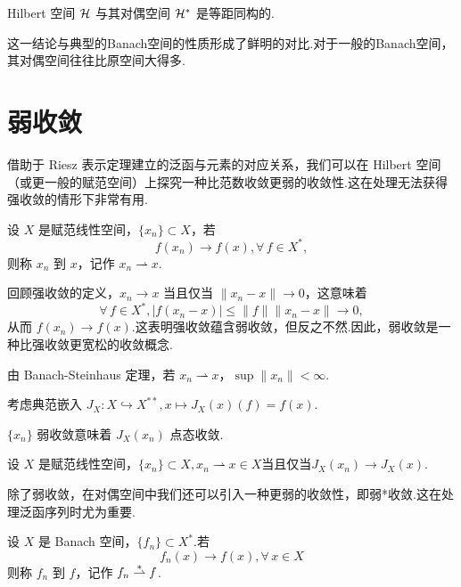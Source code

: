 \begin{corollary}
    Hilbert 空间 $\mathcal{H}$ 与其对偶空间 $\mathcal{H}^*$ 是等距同构的.
\end{corollary}
这一结论与典型的Banach空间的性质形成了鲜明的对比.对于一般的Banach空间，其对偶空间往往比原空间大得多.


\section{弱收敛}
借助于 Riesz 表示定理建立的泛函与元素的对应关系，我们可以在 Hilbert 空间（或更一般的赋范空间）上探究一种比范数收敛更弱的收敛性.这在处理无法获得强收敛的情形下非常有用.

\begin{definition}[弱收敛]
    设 $X$ 是赋范线性空间，$\{x_n\} \subset X$，若
    \begin{equation*}
        f(x_n) \to f(x), \forall\, f \in X^*,
    \end{equation*}
    则称 $x_n$ 到 $x$，记作 $x_n \rightharpoonup x$.
\end{definition}
回顾强收敛的定义，$x_n \to x$ 当且仅当 $\|x_n - x\| \to 0$，这意味着 \begin{equation*}
    \forall\, f \in X^*,|f(x_n - x)| \leq \|f\| \|x_n - x\| \to 0,
\end{equation*}
从而 $f(x_n) \to f(x)$.这表明强收敛蕴含弱收敛，但反之不然.因此，弱收敛是一种比强收敛更宽松的收敛概念.\par

\begin{note}
    由 Banach-Steinhaus 定理，若 $x_n \rightharpoonup x$，$\sup \|x_n\| < \infty$.\par
    考虑典范嵌入 $J_X : X \hookrightarrow X^{**}, x \mapsto J_X(x)(f) = f(x)$.\par
    $\{x_n\}$ 弱收敛意味着 $J_X(x_n)$ 点态收敛.
\end{note}

\begin{proposition}
    设 $X$ 是赋范线性空间，$\{x_n\} \subset X, x_n \rightharpoonup x \in X$当且仅当$J_X(x_n) \to J_X(x)$.
\end{proposition}

除了弱收敛，在对偶空间中我们还可以引入一种更弱的收敛性，即弱*收敛.这在处理泛函序列时尤为重要.

\begin{definition}[弱*收敛]
    设 $X$ 是 Banach 空间，$\{f_n\} \subset X^*$.若
    \begin{equation*}
        f_n(x) \to f(x),\forall\, x\in X
    \end{equation*}
    则称 $f_n$ 到 $f$，记作 $f_n \stackrel{*}{\rightharpoonup} f$.
\end{definition}

